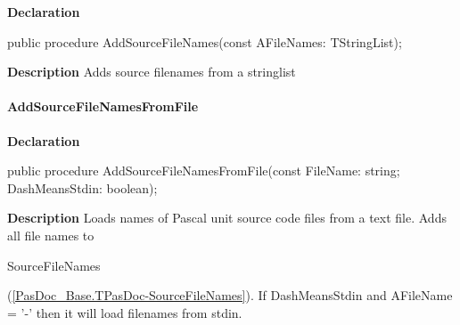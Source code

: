 \documentclass{report}
\newif\ifpdf
\begin{document}
\label{PasDoc_Base.TPasDoc-AddSourceFileNames}
\begin{list}{}{
\setlength{\itemindent}{0cm}
\setlength{\listparindent}{0cm}
\setlength{\leftmargin}{\evensidemargin}
\addtolength{\leftmargin}{\tmplength}
\settowidth{\labelsep}{X}
\addtolength{\leftmargin}{\labelsep}
\setlength{\labelwidth}{\tmplength}
}
\item[\textbf{Declaration}\hfill]
\ifpdf
\begin{flushleft}
\fi
\begin{ttfamily}
public procedure AddSourceFileNames(const AFileNames: TStringList);\end{ttfamily}

\ifpdf
\end{flushleft}
\fi

\par
\item[\textbf{Description}]
Adds source filenames from a stringlist

\end{list}
\paragraph*{AddSourceFileNamesFromFile}\hspace*{\fill}

\label{PasDoc_Base.TPasDoc-AddSourceFileNamesFromFile}
\begin{list}{}{
\setlength{\itemindent}{0cm}
\setlength{\listparindent}{0cm}
\setlength{\leftmargin}{\evensidemargin}
\addtolength{\leftmargin}{\tmplength}
\settowidth{\labelsep}{X}
\addtolength{\leftmargin}{\labelsep}
\setlength{\labelwidth}{\tmplength}
}
\item[\textbf{Declaration}\hfill]
\ifpdf
\begin{flushleft}
\fi
\begin{ttfamily}
public procedure AddSourceFileNamesFromFile(const FileName: string; DashMeansStdin: boolean);\end{ttfamily}

\ifpdf
\end{flushleft}
\fi

\par
\item[\textbf{Description}]
Loads names of Pascal unit source code files from a text file. Adds all file names to \begin{ttfamily}SourceFileNames\end{ttfamily}(\ref{PasDoc_Base.TPasDoc-SourceFileNames}). If DashMeansStdin and AFileName = '{-}' then it will load filenames from stdin.

\end{list}
\end{document}
